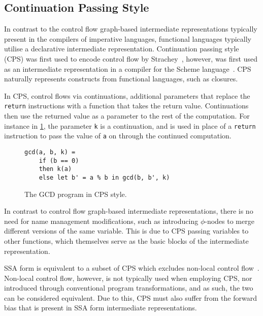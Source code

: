 \subsection{Continuation Passing Style}
\label{ssec:lit-review--cps}

In contrast to the control flow graph-based intermediate representations typically present in the compilers of imperative languages, functional languages typically utilise a declarative intermediate representation. Continuation passing style (CPS) was first used to encode control flow by Strachey~\cite{strachey2000continuations}, however, was first used as an intermediate representation in a compiler for the Scheme language~\cite{steele1978rabbit}. CPS naturally represents constructs from functional languages, such as closures.

In CPS, control flows via continuations, additional parameters that replace the \texttt{return} instructions with a function that takes the return value. Continuations then use the returned value as a parameter to the rest of the computation. For instance in \cref{fig:gcd-cps}, the parameter \texttt{k} is a continuation, and is used in place of a \texttt{return} instruction to pass the value of \texttt{a} on through the continued computation.

\begin{figure}[ht]
  \centering
  \begin{varwidth}{\linewidth}
    \begin{verbatim}
gcd(a, b, k) = 
    if (b == 0) 
    then k(a) 
    else let b' = a % b in gcd(b, b', k)
\end{verbatim}
  \end{varwidth}
  \caption{The GCD program in CPS style.}
  \label{fig:gcd-cps}
\end{figure}

In contrast to control flow graph-based intermediate representations, there is no need for name management modifications, such as introducing $\phi$-nodes to merge different versions of the same variable. This is due to CPS passing variables to other functions, which themselves serve as the basic blocks of the intermediate representation.

SSA form is equivalent to a subset of CPS which excludes non-local control flow~\cite{kelsey1995correspondence, appel1998ssa}. Non-local control flow, however, is not typically used when employing CPS, nor introduced through conventional program transformations, and as such, the two can be considered equivalent. Due to this, CPS must also suffer from the forward bias that is present in SSA form intermediate representations.

